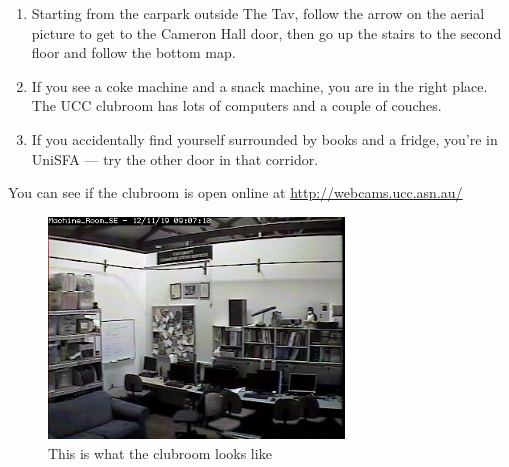 \begin{mdframed}

\begin{enumerate}
	\item Starting from the carpark outside The Tav, follow the arrow on the aerial picture to get to the Cameron Hall door, then go up the stairs to the second floor and follow the bottom map.
	\item If you see a coke machine and a snack machine, you are in the right place. The UCC clubroom has lots of computers and a couple of couches.
	\item If you accidentally find yourself surrounded by books and a fridge, you're in UniSFA --- try the other door in that corridor.
\end{enumerate}

You can see if the clubroom is open online at \url{http://webcams.ucc.asn.au/}

\begin{figure}[H]
	\centering
	\includegraphics[width=0.7\textwidth]{figures/webcam2.jpg}
	\caption{This is what the clubroom looks like}
	\label{webcam2.jpg}
\end{figure}


\end{mdframed}
